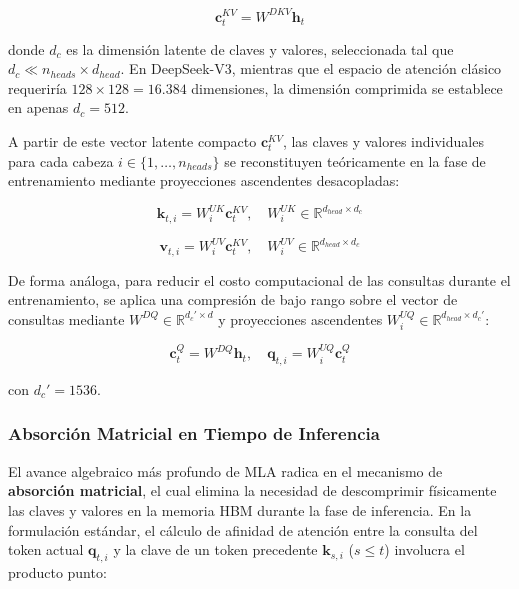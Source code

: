 \begin{equation}
\mathbf{c}_t^{KV} = W^{DKV} \mathbf{h}_t
\end{equation}

donde $d_c$ es la dimensión latente de claves y valores, seleccionada tal que $d_c \ll n_{heads} \times d_{head}$. En DeepSeek-V3, mientras que el espacio de atención clásico requeriría $128 \times 128 = 16.384$ dimensiones, la dimensión comprimida se establece en apenas $d_c = 512$.

A partir de este vector latente compacto $\mathbf{c}_t^{KV}$, las claves y valores individuales para cada cabeza $i \in \{1, \dots, n_{heads}\}$ se reconstituyen teóricamente en la fase de entrenamiento mediante proyecciones ascendentes desacopladas:

\begin{equation}
\mathbf{k}_{t,i} = W^{UK}_i \mathbf{c}_t^{KV}, \quad W^{UK}_i \in \mathbb{R}^{d_{head} \times d_c}
\end{equation}

\begin{equation}
\mathbf{v}_{t,i} = W^{UV}_i \mathbf{c}_t^{KV}, \quad W^{UV}_i \in \mathbb{R}^{d_{head} \times d_c}
\end{equation}

De forma análoga, para reducir el costo computacional de las consultas durante el entrenamiento, se aplica una compresión de bajo rango sobre el vector de consultas mediante $W^{DQ} \in \mathbb{R}^{d_c' \times d}$ y proyecciones ascendentes $W^{UQ}_i \in \mathbb{R}^{d_{head} \times d_c'}$:

\begin{equation}
\mathbf{c}_t^Q = W^{DQ} \mathbf{h}_t, \quad \mathbf{q}_{t,i} = W^{UQ}_i \mathbf{c}_t^Q
\end{equation}

con $d_c' = 1536$.

\subsubsection{Absorción Matricial en Tiempo de Inferencia}

El avance algebraico más profundo de MLA radica en el mecanismo de \textbf{absorción matricial}, el cual elimina la necesidad de descomprimir físicamente las claves y valores en la memoria HBM durante la fase de inferencia. En la formulación estándar, el cálculo de afinidad de atención entre la consulta del token actual $\mathbf{q}_{t,i}$ y la clave de un token precedente $\mathbf{k}_{s,i}$ ($s \le t$) involucra el producto punto:

